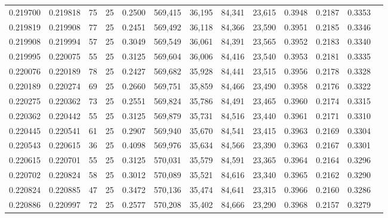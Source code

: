 \begin{tabular}{rrrrrrrrrrrrr}
0.219700 & 0.219818 &    75 &  25 &                                     0.2500 & 569,415 &  36,195 &  84,341 &  23,615 & 0.3948 & 0.2187 & 0.3353 \\
0.219819 & 0.219908 &    77 &  25 &                                     0.2451 & 569,492 &  36,118 &  84,366 &  23,590 & 0.3951 & 0.2185 & 0.3346 \\
0.219908 & 0.219994 &    57 &  25 &                                     0.3049 & 569,549 &  36,061 &  84,391 &  23,565 & 0.3952 & 0.2183 & 0.3340 \\
0.219995 & 0.220075 &    55 &  25 &                                     0.3125 & 569,604 &  36,006 &  84,416 &  23,540 & 0.3953 & 0.2181 & 0.3335 \\
0.220076 & 0.220189 &    78 &  25 &                                     0.2427 & 569,682 &  35,928 &  84,441 &  23,515 & 0.3956 & 0.2178 & 0.3328 \\
0.220189 & 0.220274 &    69 &  25 &                                     0.2660 & 569,751 &  35,859 &  84,466 &  23,490 & 0.3958 & 0.2176 & 0.3322 \\
0.220275 & 0.220362 &    73 &  25 &                                     0.2551 & 569,824 &  35,786 &  84,491 &  23,465 & 0.3960 & 0.2174 & 0.3315 \\
0.220362 & 0.220442 &    55 &  25 &                                     0.3125 & 569,879 &  35,731 &  84,516 &  23,440 & 0.3961 & 0.2171 & 0.3310 \\
0.220445 & 0.220541 &    61 &  25 &                                     0.2907 & 569,940 &  35,670 &  84,541 &  23,415 & 0.3963 & 0.2169 & 0.3304 \\
0.220543 & 0.220615 &    36 &  25 &                                     0.4098 & 569,976 &  35,634 &  84,566 &  23,390 & 0.3963 & 0.2167 & 0.3301 \\
0.220615 & 0.220701 &    55 &  25 &                                     0.3125 & 570,031 &  35,579 &  84,591 &  23,365 & 0.3964 & 0.2164 & 0.3296 \\
0.220702 & 0.220824 &    58 &  25 &                                     0.3012 & 570,089 &  35,521 &  84,616 &  23,340 & 0.3965 & 0.2162 & 0.3290 \\
0.220824 & 0.220885 &    47 &  25 &                                     0.3472 & 570,136 &  35,474 &  84,641 &  23,315 & 0.3966 & 0.2160 & 0.3286 \\
0.220886 & 0.220997 &    72 &  25 &                                     0.2577 & 570,208 &  35,402 &  84,666 &  23,290 & 0.3968 & 0.2157 & 0.3279 \\

\end{tabular}
